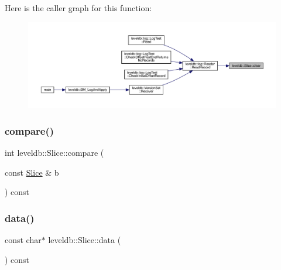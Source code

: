 Here is the caller graph for this function\+:
\nopagebreak
\begin{figure}[H]
\begin{center}
\leavevmode
\includegraphics[width=350pt]{classleveldb_1_1_slice_ab9b6e340e8a483a5cf713f6be17709e3_icgraph}
\end{center}
\end{figure}
\mbox{\label{classleveldb_1_1_slice_a1ec69137e5cee9ef34c5c4fca3c62957}} 
\subsubsection{\texorpdfstring{compare()}{compare()}}
{\footnotesize\ttfamily int leveldb\+::\+Slice\+::compare (\begin{DoxyParamCaption}\item[{const \mbox{\hyperlink{classleveldb_1_1_slice}{Slice}} \&}]{b }\end{DoxyParamCaption}) const\hspace{0.3cm}{\ttfamily [inline]}}

\mbox{\label{classleveldb_1_1_slice_a94ccee3d05b66ba0b059f2d9772b782b}} 
\subsubsection{\texorpdfstring{data()}{data()}}
{\footnotesize\ttfamily const char$\ast$ leveldb\+::\+Slice\+::data (\begin{DoxyParamCaption}{ }\end{DoxyParamCaption}) const\hspace{0.3cm}{\ttfamily [inline]}}


